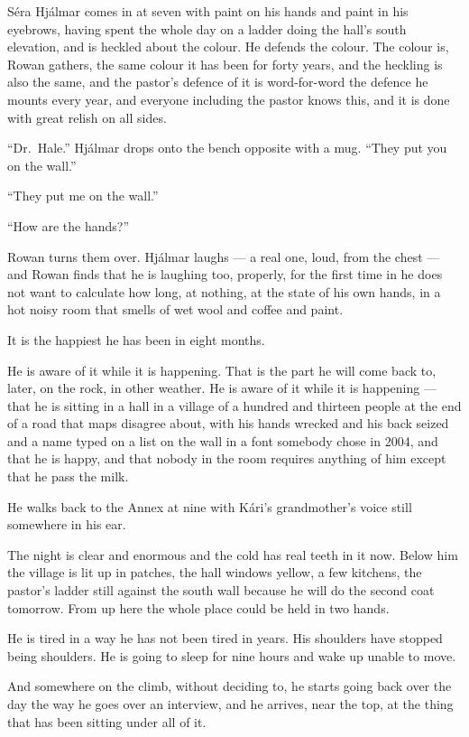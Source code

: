 \documentclass[11pt,oneside]{book}
\newcommand{\sceneline}{%
  \par\vspace{1.2em}
  \begin{center}
    \fontsize{11}{11}\selectfont \textbullet\quad\textbullet\quad\textbullet
  \end{center}
  \vspace{0.6em}\noindent\ignorespaces
}
\begin{document}
Séra Hjálmar comes in at seven with paint on his hands and paint in his
eyebrows, having spent the whole day on a ladder doing the hall's south
elevation, and is heckled about the colour. He defends the colour. The
colour is, Rowan gathers, the same colour it has been for forty years,
and the heckling is also the same, and the pastor's defence of it is
word-for-word the defence he mounts every year, and everyone including
the pastor knows this, and it is done with great relish on all sides.

``Dr.~Hale.'' Hjálmar drops onto the bench opposite with a mug. ``They
put you on the wall.''

``They put me on the wall.''

``How are the hands?''

Rowan turns them over. Hjálmar laughs --- a real one, loud, from the
chest --- and Rowan finds that he is laughing too, properly, for the
first time in he does not want to calculate how long, at nothing, at
the state of his own hands, in a hot noisy room that smells of wet wool
and coffee and paint.

It is the happiest he has been in eight months.

He is aware of it while it is happening. That is the part he will come
back to, later, on the rock, in other weather. He is aware of it while
it is happening --- that he is sitting in a hall in a village of a
hundred and thirteen people at the end of a road that maps disagree
about, with his hands wrecked and his back seized and a name typed on a
list on the wall in a font somebody chose in 2004, and that he is
happy, and that nobody in the room requires anything of him except that
he pass the milk.

\sceneline

He walks back to the Annex at nine with Kári's grandmother's voice still
somewhere in his ear.

The night is clear and enormous and the cold has real teeth in it now.
Below him the village is lit up in patches, the hall windows yellow, a
few kitchens, the pastor's ladder still against the south wall because
he will do the second coat tomorrow. From up here the whole place could
be held in two hands.

He is tired in a way he has not been tired in years. His shoulders have
stopped being shoulders. He is going to sleep for nine hours and wake
up unable to move.

And somewhere on the climb, without deciding to, he starts going back
over the day the way he goes over an interview, and he arrives, near the
top, at the thing that has been sitting under all of it.
\end{document}
